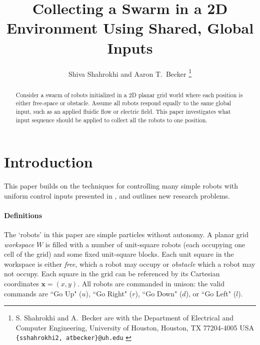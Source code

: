 \documentclass[letterpaper, 10 pt, conference]{ieeeconf}
\begin{document}


\title{\LARGE \bf 
Collecting a Swarm in a 2D Environment Using Shared, Global Inputs
}
\author{Shiva Shahrokhi and  Aaron T.\ Becker%
\thanks{{S. Shahrokhi and A.\ Becker are with the Department of Electrical and Computer Engineering,  University of Houston, Houston, TX 77204-4005 USA {\tt\small  \{sshahrokhi2, atbecker\}@uh.edu}
}
} %
} %
\maketitle

\begin{abstract}
Consider a swarm of robots initialized in a 2D planar grid world where each position is either free-space or obstacle.   Assume all robots respond equally to the same global input, such as an applied fluidic flow or electric field.
This paper investigates what input sequence should be applied to collect all the robots to one position.
\end{abstract}




  \section{Introduction}
  
  This paper builds on the techniques for controlling many simple robots with uniform control inputs presented in \cite{Becker2013f,Becker2014,Becker2014a}, and outlines new research problems.
  
  
 \paragraph{Definitions}
The `robots' in this paper are simple particles without autonomy.
A planar  grid \emph{workspace} $W$ is filled with a number of unit-square robots (each occupying one cell of the grid)  and some fixed unit-square blocks.  Each unit square in the workspace is either  \emph{free}, which a robot may occupy or \emph{obstacle} which a robot may not occupy.  Each square in the grid can be referenced by its Cartesian coordinates $\bm{x}=(x,y)$.
All robots are commanded in unison: the valid commands are  ``Go Up" ($u$), ``Go Right" ($r$), ``Go Down" ($d$), or ``Go Left" ($l$).  
\end{document}
